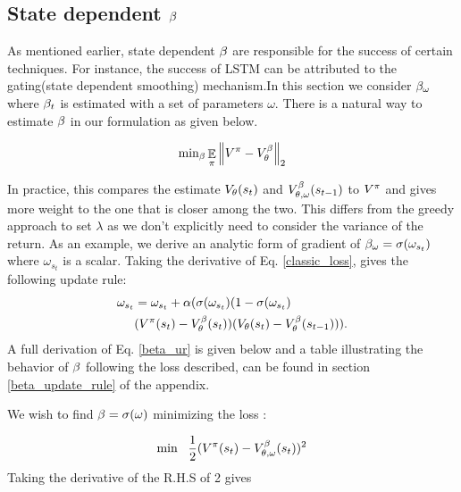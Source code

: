 



\subsection{State dependent $\beta$}
As mentioned earlier, state dependent $\beta$ are responsible for the success of certain techniques. For instance, the success of LSTM \cite{hochreiter1997long} can be attributed to the gating(state dependent smoothing) mechanism.In this section we consider $\beta_{\omega}$ where $\beta_t$ is estimated with a set of parameters $\omega$. There is a natural way to estimate $\beta$ in our formulation as given below.

\begin{equation}\label{classic_loss}
    \text{min}_{\beta} \mathop{\mathbb{E}}_{\pi}\left\lVert V^{\pi}-V^{\beta}_{\theta}\right\rVert_{2}
\end{equation}

In practice, this compares the estimate $V_{\theta}(s_t)$ and $V^{\beta}_{\theta,\omega}(s_{t-1})$ to $V^{\pi}$ and gives more weight to the one that is closer among the two. This differs from the greedy approach\cite{white2016greedy} to set $\lambda$ as we don't explicitly need to consider the variance of the return.
As an example, we derive an analytic form of gradient of $\beta_{\omega} = \sigma(\omega_{s_t})$ where $\omega_{s_t}$ is a scalar. Taking the derivative of Eq. \ref{classic_loss}, gives the following update rule:
\begin{equation}
\begin{split}
    \omega_{s_t} &= \omega_{s_t} + \alpha ( \sigma (\omega_{s_t})(1 -  \sigma(\omega_{s_t}) \\
    &(V^{\pi}(s_t) -V^{\beta}_{\theta}(s_t) )(V_{\theta}(s_t) - V^{\beta}_{\theta}(s_{t-1}))).  \label{beta_ur}
\end{split}
\end{equation}
A full derivation of Eq. \ref{beta_ur} is given below and a table illustrating the behavior of $\beta$ following the loss described, can be found in section \ref{beta_update_rule} of the appendix.


We wish to find $\beta = \sigma(\omega)$ minimizing the loss : 

\begin{align}
    \min \ \ \frac{1}{2}(V^{\pi}(s_t) - V^{\beta}_{\theta,\omega}(s_t))^2  \\
\end{align}
Taking the derivative of the R.H.S of 2 gives

